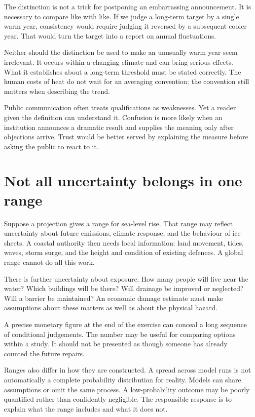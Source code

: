 \documentclass[12pt,a4paper]{book}
\begin{document}
The distinction is not a trick for postponing an embarrassing announcement. It is necessary to compare like with like. If we judge a long-term target by a single warm year, consistency would require judging it reversed by a subsequent cooler year. That would turn the target into a report on annual fluctuations.

Neither should the distinction be used to make an unusually warm year seem irrelevant. It occurs within a changing climate and can bring serious effects. What it establishes about a long-term threshold must be stated correctly. The human costs of heat do not wait for an averaging convention; the convention still matters when describing the trend.

Public communication often treats qualifications as weaknesses. Yet a reader given the definition can understand it. Confusion is more likely when an institution announces a dramatic result and supplies the meaning only after objections arrive. Trust would be better served by explaining the measure before asking the public to react to it.

\section*{Not all uncertainty belongs in one range}

Suppose a projection gives a range for sea-level rise. That range may reflect uncertainty about future emissions, climate response, and the behaviour of ice sheets. A coastal authority then needs local information: land movement, tides, waves, storm surge, and the height and condition of existing defences. A global range cannot do all this work.

There is further uncertainty about exposure. How many people will live near the water? Which buildings will be there? Will drainage be improved or neglected? Will a barrier be maintained? An economic damage estimate must make assumptions about these matters as well as about the physical hazard.

A precise monetary figure at the end of the exercise can conceal a long sequence of conditional judgements. The number may be useful for comparing options within a study. It should not be presented as though someone has already counted the future repairs.

Ranges also differ in how they are constructed. A spread across model runs is not automatically a complete probability distribution for reality. Models can share assumptions or omit the same process. A low-probability outcome may be poorly quantified rather than confidently negligible. The responsible response is to explain what the range includes and what it does not.
\end{document}
